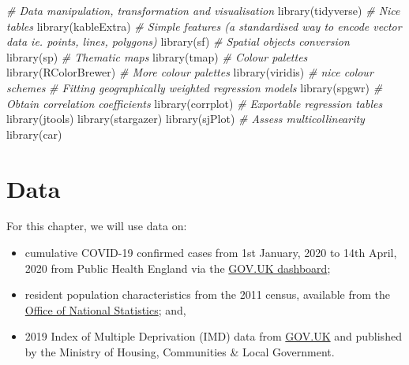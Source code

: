 \documentclass[
]{book}
\newenvironment{Shaded}{\begin{snugshade}}{\end{snugshade}}
\newcommand{\CommentTok}[1]{\textcolor[rgb]{0.56,0.35,0.01}{\textit{#1}}}
\newcommand{\FunctionTok}[1]{\textcolor[rgb]{0.00,0.00,0.00}{#1}}
\newcommand{\NormalTok}[1]{#1}
\begin{document}
\begin{Shaded}
\begin{Highlighting}[]
\CommentTok{\# Data manipulation, transformation and visualisation}
\FunctionTok{library}\NormalTok{(tidyverse)}
\CommentTok{\# Nice tables}
\FunctionTok{library}\NormalTok{(kableExtra)}
\CommentTok{\# Simple features (a standardised way to encode vector data ie. points, lines, polygons)}
\FunctionTok{library}\NormalTok{(sf) }
\CommentTok{\# Spatial objects conversion}
\FunctionTok{library}\NormalTok{(sp) }
\CommentTok{\# Thematic maps}
\FunctionTok{library}\NormalTok{(tmap) }
\CommentTok{\# Colour palettes}
\FunctionTok{library}\NormalTok{(RColorBrewer) }
\CommentTok{\# More colour palettes}
\FunctionTok{library}\NormalTok{(viridis) }\CommentTok{\# nice colour schemes}
\CommentTok{\# Fitting geographically weighted regression models}
\FunctionTok{library}\NormalTok{(spgwr)}
\CommentTok{\# Obtain correlation coefficients}
\FunctionTok{library}\NormalTok{(corrplot)}
\CommentTok{\# Exportable regression tables}
\FunctionTok{library}\NormalTok{(jtools)}
\FunctionTok{library}\NormalTok{(stargazer)}
\FunctionTok{library}\NormalTok{(sjPlot)}
\CommentTok{\# Assess multicollinearity}
\FunctionTok{library}\NormalTok{(car)}
\end{Highlighting}
\end{Shaded}

\hypertarget{data-5}{%
\section{Data}\label{data-5}}

For this chapter, we will use data on:

\begin{itemize}
\item
  cumulative COVID-19 confirmed cases from 1st January, 2020 to 14th April, 2020 from Public Health England via the \href{https://coronavirus.data.gov.uk}{GOV.UK dashboard};
\item
  resident population characteristics from the 2011 census, available from the \href{https://www.nomisweb.co.uk/home/census2001.asp}{Office of National Statistics}; and,
\item
  2019 Index of Multiple Deprivation (IMD) data from \href{https://www.gov.uk/government/statistics/english-indices-of-deprivation-2019}{GOV.UK} and published by the Ministry of Housing, Communities \& Local Government.
\end{itemize}
\end{document}
